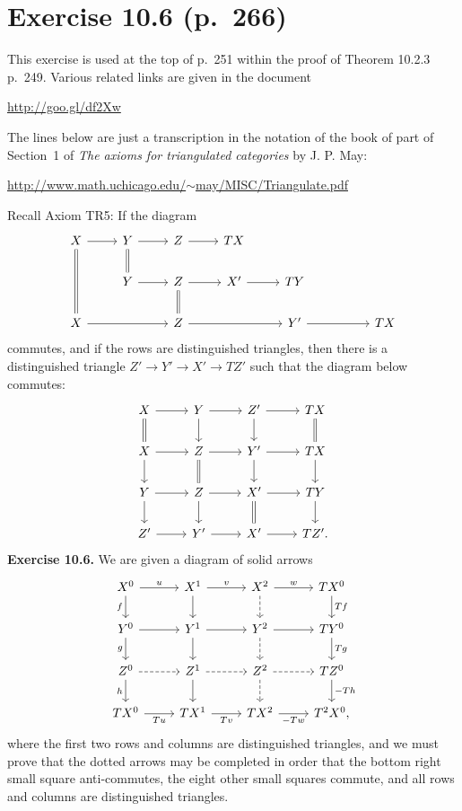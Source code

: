 \documentclass[12pt]{article}
\theoremstyle{remark}%
\newcommand{\n}{\noindent}
\begin{document}
\section{Exercise 10.6 (p.~266)}%
%
This exercise is used at the top of p.~251 within the proof of Theorem 10.2.3 p.~249. Various related links are given in the document\smallskip

\centerline{\href{http://goo.gl/df2Xw}{http://goo.gl/df2Xw}}

\n The lines below are just a transcription in the notation of the book of part of Section~1 of \emph{The axioms for triangulated categories} by J. P. May:\smallskip

\centerline{\href{http://www.math.uchicago.edu/~may/MISC/Triangulate.pdf}{http://www.math.uchicago.edu/$\sim$may/MISC/Triangulate.pdf}}

Recall Axiom TR5: If the diagram
$$
\begin{tikzcd}
X\ar[equal]{dd}\ar{r}&Y\ar[equal]{d}\ar{r}&Z\ar{r}&TX\\
&Y\ar{r}&Z\ar[equal]{d}\ar{r}&X'\ar{r}&TY\\
X\ar{rr}&&Z\ar{rr}&&Y'\ar{rr}&&TX
\end{tikzcd}
$$
commutes, and if the rows are distinguished triangles, then there is a distinguished triangle $Z'\to Y'\to X'\to TZ'$ such that the diagram below commutes:
$$
\begin{tikzcd}
X\ar{r}\ar[equal]{d}&Y\ar{d}\ar{r}&Z'\ar{d}\ar{r}&TX\ar[equal]{d}\\
X\ar{d}\ar{r}&Z\ar{r}\ar[equal]{d}&Y'\ar{d}\ar{r}&TX\ar{d}\\
Y\ar{d}\ar{r}&Z\ar{d}\ar{r}&X'\ar{r}\ar[equal]{d}&TY\ar{d}\\
Z'\ar{r}&Y'\ar{r}&X'\ar{r}&TZ'.
\end{tikzcd}
$$
\textbf{Exercise 10.6.} We are given a diagram of solid arrows 
$$
\begin{tikzcd}
X^0\ar{r}{u}\ar{d}[swap]{f}&X^1\ar{d}\ar{r}{v}&X^2\ar[dashed]{d}\ar{r}{w}&TX^0\ar{d}{Tf}\\ 
Y^0\ar{r}\ar{d}[swap]{g}&Y^1\ar{d}\ar{r}&Y^2\ar[dashed]{d}\ar{r}&TY^0\ar{d}{Tg}\\ 
Z^0\ar[dashed]{r}\ar{d}[swap]{h}&Z^1\ar{d}\ar[dashed]{r}&Z^2\ar[dashed]{d}\ar[dashed]{r}&TZ^0\ar{d}{-Th}\\ 
TX^0\ar{r}[swap]{Tu}&TX^1\ar{r}[swap]{Tv}&TX^2\ar{r}[swap]{-Tw}&T^2X^0,
\end{tikzcd}
$$
where the first two rows and columns are distinguished triangles, and we must prove that the dotted arrows may be completed in order that the bottom right small square anti-commutes, the eight other small squares commute, and all rows and columns are distinguished triangles.
\end{document}
